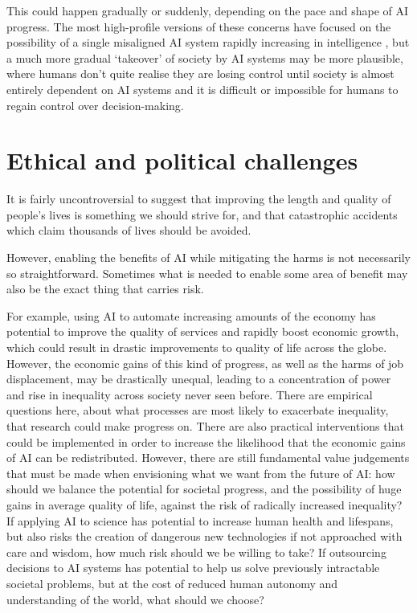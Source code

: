 \documentclass{article}
\begin{document}
This could happen gradually or suddenly, depending on the pace and shape of AI progress. The most high-profile versions of these concerns have focused on the possibility of a single misaligned AI system rapidly increasing in intelligence \citep{bostrom_superintelligence_2014}, but a much more gradual ‘takeover’ of society by AI systems may be more plausible, where humans don’t quite realise they are losing control until society is almost entirely dependent on AI systems and it is difficult or impossible for humans to regain control over decision-making.

\section{Ethical and political challenges}

It is fairly uncontroversial to suggest that improving the length and quality of people’s lives is something we should strive for, and that catastrophic accidents which claim thousands of lives should be avoided.

However, enabling the benefits of AI while mitigating the harms is not necessarily so straightforward. Sometimes what is needed to enable some area of benefit may also be the exact thing that carries risk.

For example, using AI to automate increasing amounts of the economy has potential to improve the quality of services and rapidly boost economic growth, which could result in drastic improvements to quality of life across the globe. However, the economic gains of this kind of progress, as well as the harms of job displacement, may be drastically unequal, leading to a concentration of power and rise in inequality across society never seen before. There are empirical questions here, about what processes are most likely to exacerbate inequality, that research could make progress on. There are also practical interventions that could be implemented in order to increase the likelihood that the economic gains of AI can be redistributed. However, there are still fundamental value judgements that must be made when envisioning what we want from the future of AI: how should we balance the potential for societal progress, and the possibility of huge gains in average quality of life, against the risk of radically increased inequality? If applying AI to science has potential to increase human health and lifespans, but also risks the creation of dangerous new technologies if not approached with care and wisdom, how much risk should we be willing to take? If outsourcing decisions to AI systems has potential to help us solve previously intractable societal problems, but at the cost of reduced human autonomy and understanding of the world, what should we choose?
\end{document}
